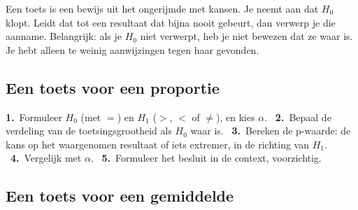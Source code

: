 Een toets is een bewijs uit het ongerijmde met kansen. Je neemt aan dat $H_0$ klopt. Leidt dat tot een resultaat dat bijna nooit gebeurt, dan verwerp je die aanname. Belangrijk: als je $H_0$ niet verwerpt, heb je niet bewezen dat ze waar is. Je hebt alleen te weinig aanwijzingen tegen haar gevonden.

\begin{oefeningen}
\end{oefeningen}

\subsection{Een toets voor een proportie}


\begin{werkwijze}
\textbf{1.}~Formuleer $H_0$ (met $=$) en $H_1$ ($>$, $<$ of $\neq$), en kies $\alpha$. \ \textbf{2.}~Bepaal de verdeling van de toetsingsgrootheid als $H_0$ waar is. \ \textbf{3.}~Bereken de p-waarde: de kans op het waargenomen resultaat of iets extremer, in de richting van $H_1$. \ \textbf{4.}~Vergelijk met $\alpha$. \ \textbf{5.}~Formuleer het besluit in de context, voorzichtig.
\end{werkwijze}

\begin{oefeningen}
\end{oefeningen}

\subsection{Een toets voor een gemiddelde}

